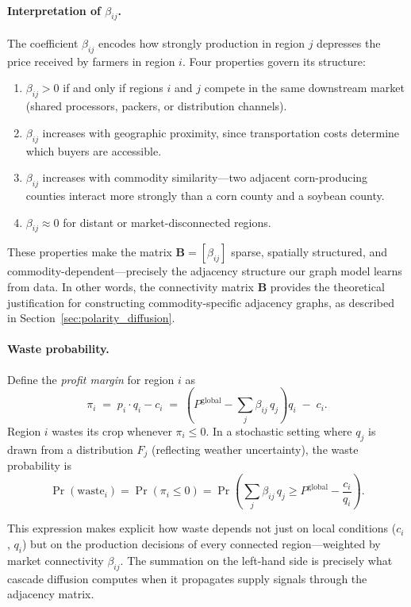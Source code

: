 \documentclass[preprint,12pt,authoryear]{elsarticle}
\begin{document}
\paragraph{Interpretation of $\beta_{ij}$.}
The coefficient $\beta_{ij}$ encodes how strongly production in region $j$ depresses the price received by farmers in region $i$.
Four properties govern its structure:
\begin{enumerate}[label=(\roman*)]
    \item $\beta_{ij} > 0$ if and only if regions $i$ and $j$ compete in the same downstream market (shared processors, packers, or distribution channels).
    \item $\beta_{ij}$ increases with geographic proximity, since transportation costs determine which buyers are accessible.
    \item $\beta_{ij}$ increases with commodity similarity---two adjacent corn-producing counties interact more strongly than a corn county and a soybean county.
    \item $\beta_{ij} \approx 0$ for distant or market-disconnected regions.
\end{enumerate}
These properties make the matrix $\mathbf{B} = [\beta_{ij}]$ sparse, spatially structured, and commodity-dependent---precisely the adjacency structure our graph model learns from data. In other words, the connectivity matrix $\mathbf{B}$ provides the theoretical justification for constructing commodity-specific adjacency graphs, as described in Section~\ref{sec:polarity_diffusion}.

\paragraph{Waste probability.}
Define the \emph{profit margin} for region $i$ as
\begin{equation}
\label{eq:margin}
\pi_i \;=\; p_i \cdot q_i - c_i \;=\; \left(P^{\mathrm{global}} - \sum_{j} \beta_{ij}\, q_j \right) q_i \;-\; c_i.
\end{equation}
Region $i$ wastes its crop whenever $\pi_i \leq 0$.
In a stochastic setting where $q_j$ is drawn from a distribution $F_j$ (reflecting weather uncertainty), the waste probability is
\begin{equation}
\label{eq:waste_prob}
\Pr(\text{waste}_i) = \Pr\!\left(\pi_i \leq 0\right) = \Pr\!\left(\sum_{j} \beta_{ij}\, q_j \geq P^{\mathrm{global}} - \frac{c_i}{q_i}\right).
\end{equation}

This expression makes explicit how waste depends not just on local conditions ($c_i$, $q_i$) but on the production decisions of every connected region---weighted by market connectivity $\beta_{ij}$. The summation on the left-hand side is precisely what cascade diffusion computes when it propagates supply signals through the adjacency matrix.
\end{document}

